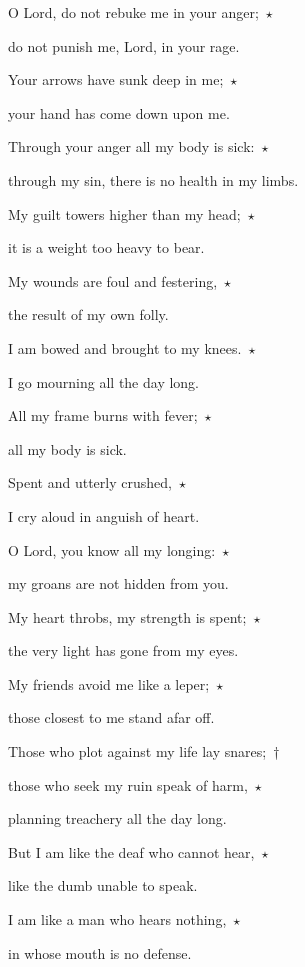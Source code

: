 \noindent O Lord, do not rebuke me in your anger;~$\star$~\nopagebreak

do not punish me, Lord, in your rage.

\noindent Your arrows have sunk deep in me;~$\star$~\nopagebreak

your hand has come down upon me.

\noindent Through your anger all my body is sick:~$\star$~\nopagebreak

through my sin, there is no health in my limbs.

\noindent My guilt towers higher than my head;~$\star$~\nopagebreak

it is a weight too heavy to bear.

\noindent My wounds are foul and festering,~$\star$~\nopagebreak

the result of my own folly.

\noindent I am bowed and brought to my knees.~$\star$~\nopagebreak

I go mourning all the day long.

\noindent All my frame burns with fever;~$\star$~\nopagebreak

all my body is sick.

\noindent Spent and utterly crushed,~$\star$~\nopagebreak

I cry aloud in anguish of heart.

\noindent O Lord, you know all my longing:~$\star$~\nopagebreak

my groans are not hidden from you.

\noindent My heart throbs, my strength is spent;~$\star$~\nopagebreak

the very light has gone from my eyes.

\noindent My friends avoid me like a leper;~$\star$~\nopagebreak

those closest to me stand afar off.

\noindent Those who plot against my life lay snares;~†~\nopagebreak

those who seek my ruin speak of harm,~$\star$~\nopagebreak

planning treachery all the day long.

\noindent But I am like the deaf who cannot hear,~$\star$~\nopagebreak

like the dumb unable to speak.

\noindent I am like a man who hears nothing,~$\star$~\nopagebreak

in whose mouth is no defense.


